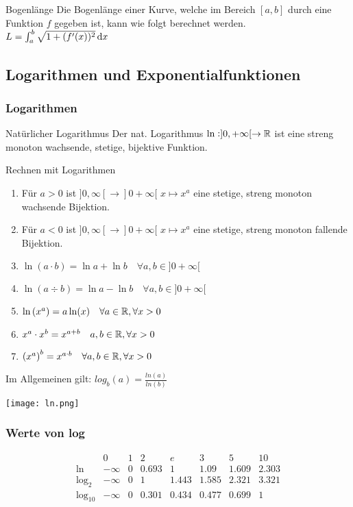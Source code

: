 \begin{theorem}{Bogenlänge}
	Die Bogenlänge einer Kurve, welche im Bereich $[a,b]$ durch eine Funktion $f$ gegeben ist, kann wie folgt berechnet werden.
	\\$L = \int_{a}^{b} \sqrt{1 + ( f'(x) )^2} \dif x$
\end{theorem}

\subsection{Logarithmen und Exponentialfunktionen}

\subsubsection{Logarithmen}
\begin{corollary}{Natürlicher Logarithmus}
   Der nat. Logarithmus $\ln:]0, + \infty[ \to \mathbb{R}$ ist eine streng monoton wachsende, stetige, bijektive Funktion.
\end{corollary}

\begin{corollary}{Rechnen mit Logarithmen}
    \begin{enumerate}
        \item Für $a > 0$ ist $]0, \infty[ \to ]0 + \infty[$ \quad $x \mapsto x^a$ eine stetige, streng monoton wachsende Bijektion.
        \item Für $a < 0$ ist $]0, \infty[ \to ]0 + \infty[$ \quad $x \mapsto x^a$ eine stetige, streng monoton fallende Bijektion.
        \item $\ln (a \cdot b) = \ln a + \ln b \quad \forall a,b \in ]0 +  \infty[$
        \item $\ln (a \div b) = \ln a - \ln b \quad \forall a,b \in ]0 +  \infty[$
        \item ${\ln \left(x^a\right) = a \ln (x) \quad \forall a \in \mathbb{R}, \forall x > 0}$
        \item ${x^a \cdot x^b = x^{a+b} \quad a,b \in \mathbb{R}, \forall x > 0}$
        \item ${\left(x^a\right)^b = x^{a \cdot b} \quad \forall a,b \in \mathbb{R}, \forall x > 0}$
    \end{enumerate}
    Im Allgemeinen gilt: $log_b (a) = \frac{ln(a)}{ln(b)}$
\end{corollary}

\texttt{[image: ln.png]}

\subsubsection{Werte von log}
\begin{equation*}
	\begin{array}{lccccccc}
		& 0 & 1 & 2 & e & 3 & 5 & 10\\
		\ln & - \infty & 0 & 0.693 & 1 & 1.09 & 1.609 & 2.303\\
		\log_2 & - \infty & 0 & 1 & 1.443 & 1.585 & 2.321 & 3.321\\
		\log_{10} & - \infty & 0 & 0.301 & 0.434 & 0.477 & 0.699 & 1
	\end{array}
\end{equation*}

